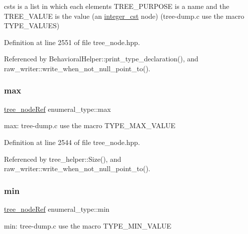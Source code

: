 csts is a list in which each element\textquotesingle{}s T\+R\+E\+E\+\_\+\+P\+U\+R\+P\+O\+SE is a name and the T\+R\+E\+E\+\_\+\+V\+A\+L\+UE is the value (an \hyperlink{structinteger__cst}{integer\+\_\+cst} node) (tree-\/dump.\+c use the macro T\+Y\+P\+E\+\_\+\+V\+A\+L\+U\+ES) 



Definition at line 2551 of file tree\+\_\+node.\+hpp.



Referenced by Behavioral\+Helper\+::print\+\_\+type\+\_\+declaration(), and raw\+\_\+writer\+::write\+\_\+when\+\_\+not\+\_\+null\+\_\+point\+\_\+to().

\mbox{\label{structenumeral__type_a0f0781dc2b36ed4e831d41671405e2ca}} 
\subsubsection{\texorpdfstring{max}{max}}
{\footnotesize\ttfamily \hyperlink{tree__node_8hpp_a6ee377554d1c4871ad66a337eaa67fd5}{tree\+\_\+node\+Ref} enumeral\+\_\+type\+::max}



max\+: tree-\/dump.\+c use the macro T\+Y\+P\+E\+\_\+\+M\+A\+X\+\_\+\+V\+A\+L\+UE 



Definition at line 2544 of file tree\+\_\+node.\+hpp.



Referenced by tree\+\_\+helper\+::\+Size(), and raw\+\_\+writer\+::write\+\_\+when\+\_\+not\+\_\+null\+\_\+point\+\_\+to().

\mbox{\label{structenumeral__type_acd66636f708fb157ce05a96cf5656100}} 
\subsubsection{\texorpdfstring{min}{min}}
{\footnotesize\ttfamily \hyperlink{tree__node_8hpp_a6ee377554d1c4871ad66a337eaa67fd5}{tree\+\_\+node\+Ref} enumeral\+\_\+type\+::min}



min\+: tree-\/dump.\+c use the macro T\+Y\+P\+E\+\_\+\+M\+I\+N\+\_\+\+V\+A\+L\+UE 



